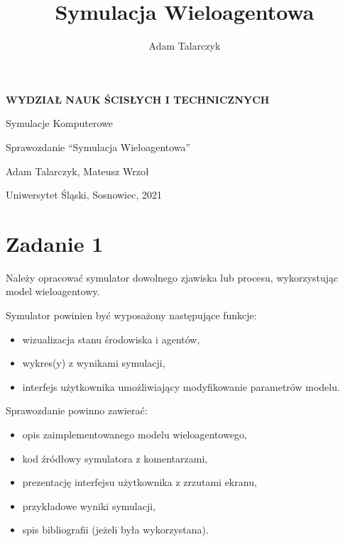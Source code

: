 \documentclass[a4paper,11pt,titlepage]{article}
\author{Adam Talarczyk}
\title{Symulacja Wieloagentowa}
\begin{document}
\begin{titlepage}
    \begin{center}

        \Huge
        \textbf{WYDZIAŁ NAUK ŚCISŁYCH I TECHNICZNYCH}
        
        
        \vspace{1.5cm}
	   Symulacje Komputerowe
        \LARGE
        
	\vspace{2cm}
	
	Sprawozdanie ``Symulacja Wieloagentowa''

	\vspace{1cm}
	Adam Talarczyk, Mateusz Wrzoł
	
	\vspace{5cm}
        \vfill

        \vspace{0.8cm}
	\Large
        Uniwersytet Śląski, Sosnowiec, 2021

    \end{center}
\end{titlepage}
\newpage

\tableofcontents
\newpage

\section{Zadanie 1}
Należy opracować symulator dowolnego zjawiska lub procesu, wykorzystując model wieloagentowy.

Symulator powinien być wyposażony następujące funkcje:
\begin{itemize}
\item wizualizacja stanu środowiska i agentów,
\item wykres(y) z wynikami symulacji,
\item interfejs użytkownika umożliwiający modyfikowanie parametrów modelu.
\end{itemize}


Sprawozdanie powinno zawierać:
\begin{itemize}
\item opis zaimplementowanego modelu wieloagentowego,
\item kod źródłowy symulatora z komentarzami,
\item prezentację interfejsu użytkownika z zrzutami ekranu,
\item przykładowe wyniki symulacji,
\item spis bibliografii (jeżeli była wykorzystana).
\end{itemize}
\end{document}
